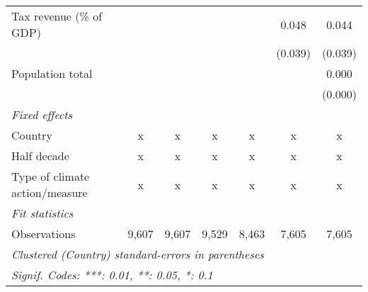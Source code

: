 \begin{tabular}{lcccccc}
   Tax revenue (\% of GDP)                         &         &         &               &              & 0.048        & 0.044\\   
                                                   &         &         &               &              & (0.039)      & (0.039)\\   
   Population total                                &         &         &               &              &              & 0.000\\   
                                                   &         &         &               &              &              & (0.000)\\   
   \emph{Fixed effects}\\
   Country                                         & x       & x       & x             & x            & x            & x\\  
   Half decade                                     & x       & x       & x             & x            & x            & x\\  
   Type of climate action/measure                  & x       & x       & x             & x            & x            & x\\  
   \midrule \emph{Fit statistics}\\
   Observations                                    & 9,607   & 9,607   & 9,529         & 8,463        & 7,605        & 7,605\\  
   \midrule
   \multicolumn{7}{l}{\emph{Clustered (Country) standard-errors in parentheses}}\\
   \multicolumn{7}{l}{\emph{Signif. Codes: ***: 0.01, **: 0.05, *: 0.1}}\\
\end{tabular}
\par\endgroup


